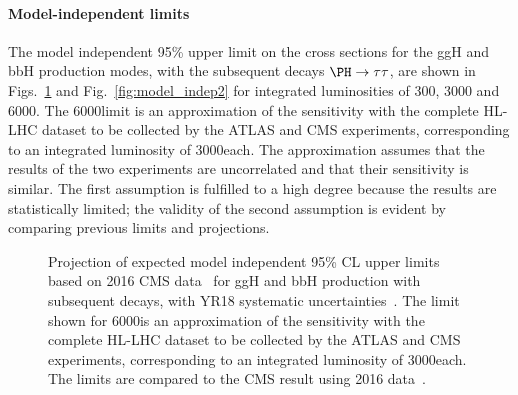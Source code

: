 \paragraph{Model-independent limits}
\label{sec:model_indep}
%
The model independent 
95\% \CL upper
limit on the cross sections for the ggH and bbH 
production modes, 
with the subsequent decays $\PH\to\tau\tau$,
are shown in Figs.~\ref{fig:model_indep} and Fig.~\ref{fig:model_indep2} for 
integrated luminosities of 300, 3000 and 6000\fbinv.
The 6000\fbinv limit is an approximation of the sensitivity with the complete HL-LHC 
dataset to be collected by the ATLAS and CMS experiments, corresponding to an integrated 
luminosity of 3000\fbinv each. The approximation assumes that the results of the 
two experiments are uncorrelated and that their sensitivity is similar. The first 
assumption is fulfilled to a high degree because the results are statistically limited; 
the validity of the second assumption is evident by comparing previous limits and 
projections. 
%
\begin{figure}[htbp]
\begin{center}
\end{center}
\caption{Projection of expected model independent
  95\% CL upper limits based on 2016 CMS data~\cite{HIG-17-020} for 
ggH and bbH production with subsequent \htt decays, with YR18 systematic 
uncertainties~\cite{CMS-PAS-FTR-18-017}. 
The limit shown for 6000\fbinv is an approximation of the 
sensitivity with the complete HL-LHC dataset to be collected by the ATLAS and 
CMS experiments, corresponding to an integrated luminosity of 3000\fbinv each.
The limits are compared to the CMS result using 2016 data~\cite{HIG-17-020}.}
\label{fig:model_indep}
\end{figure}


